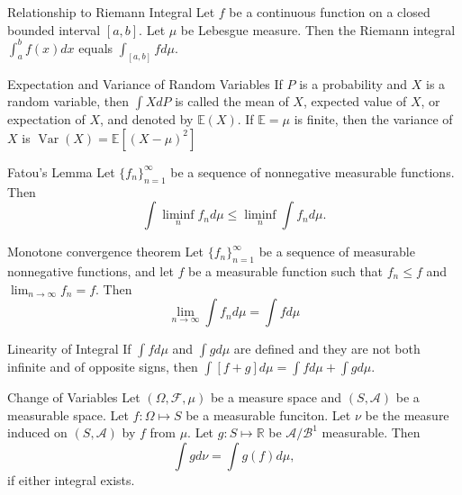 \documentclass[avery5371,grid]{flashcards}
\begin{document}
\begin{flashcard}[Theorem]{Relationship to Riemann Integral}
Let $f$ be a continuous function on a closed bounded interval $\left[ a,b \right]$.
Let $\mu$ be Lebesgue measure. Then the Riemann integral $\int_a^b f(x) dx$ equals
$\int_{\left[ a,b \right]} f d\mu$.
\end{flashcard}

\begin{flashcard}[Definition]{Expectation and Variance of Random Variables}
 If $P$ is a probability and $X$ is a random variable, then
 $\int X dP$ is called the mean of $X$, expected value of $X$,  or expectation of
 $X$, and denoted by $\mathbb{E}\left( X \right)$. If $\mathbb{E} = \mu$ is finite, 
 then the variance of $X$ is $\operatorname{Var}\left( X \right) = \mathbb{E} \left[ \left( X - \mu \right)^2 \right]$
\end{flashcard}

\begin{flashcard}[Theorem]{Fatou's Lemma}
Let $\{ f_n \}_{n=1}^\infty$ be a sequence of nonnegative measurable functions. Then
\[
\int \liminf_n f_n d\mu \le \liminf_n \int f_n d\mu.
\]
\end{flashcard}

\begin{flashcard}[Theorem]{Monotone convergence theorem}
 Let $\{ f_n \}_{n=1}^\infty$ be a sequence of measurable nonnegative functions, and let $f$
be a measurable function such that $f_n \le f$ and $\lim_{n \to \infty} f_n = f$. Then
\[
\lim_{n \to \infty} \int f_n d\mu = \int f d\mu
\]
\end{flashcard}

\begin{flashcard}[Theorem]{Linearity of Integral}
 If $\int f d\mu$ and $\int g d\mu$ are defined and they are not both infinite and of 
 opposite signs, then $\int \left[ f + g \right] d\mu = \int f d\mu + \int g d\mu $. 
\end{flashcard}

\begin{flashcard}[Lemma]{Change of Variables}
  Let $\left( \Omega,\mathcal{F},\mu \right)$ be a measure space and $\left( S,\mathcal{A} \right)$
  be a measurable space. Let $f: \Omega \mapsto S$ be a measurable funciton. Let $\nu$ 
  be the measure induced on $\left( S, \mathcal{A} \right)$ by $f$ from $\mu$. Let $g : S \mapsto \mathbb{R}$
  be $\mathcal{A}/\mathcal{B}^1$ measurable. Then
  \[
  \int g d\nu = \int g(f) d\mu,
  \]
  if either integral exists.
\end{flashcard}
\end{document}
